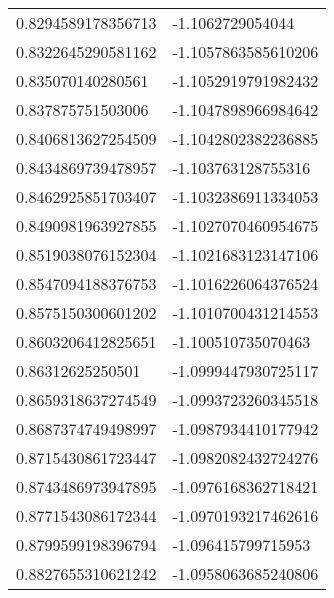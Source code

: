 \begin{supertabular}{ll}
0.8294589178356713  & -1.1062729054044      \\
0.8322645290581162  & -1.1057863585610206   \\
0.835070140280561   & -1.1052919791982432   \\
0.837875751503006   & -1.1047898966984642   \\
0.8406813627254509  & -1.1042802382236885   \\
0.8434869739478957  & -1.103763128755316    \\
0.8462925851703407  & -1.1032386911334053   \\
0.8490981963927855  & -1.1027070460954675   \\
0.8519038076152304  & -1.1021683123147106   \\
0.8547094188376753  & -1.1016226064376524   \\
0.8575150300601202  & -1.1010700431214553   \\
0.8603206412825651  & -1.100510735070463    \\
0.86312625250501    & -1.0999447930725117   \\
0.8659318637274549  & -1.0993723260345518   \\
0.8687374749498997  & -1.0987934410177942   \\
0.8715430861723447  & -1.0982082432724276   \\
0.8743486973947895  & -1.0976168362718421   \\
0.8771543086172344  & -1.0970193217462616   \\
0.8799599198396794  & -1.096415799715953    \\
0.8827655310621242  & -1.0958063685240806   \\
\end{supertabular}
